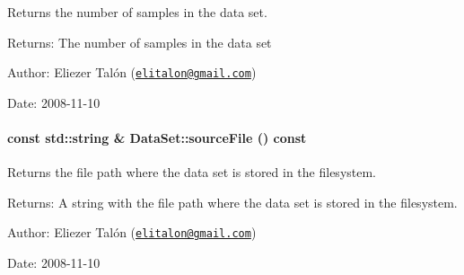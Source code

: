Returns the number of samples in the data set. 

\begin{Desc}
\item[Returns:]The number of samples in the data set\end{Desc}
\begin{Desc}
\item[Author:]Eliezer Talón (\href{mailto:elitalon@gmail.com}{\tt elitalon@gmail.com}) \end{Desc}
\begin{Desc}
\item[Date:]2008-11-10 \end{Desc}
\hypertarget{class_data_set_d7d233212f54f5c2764430b0cb1bea65}{
\paragraph[{sourceFile}]{\setlength{\rightskip}{0pt plus 5cm}const std::string \& DataSet::sourceFile () const}\hfill}
\label{class_data_set_d7d233212f54f5c2764430b0cb1bea65}


Returns the file path where the data set is stored in the filesystem. 

\begin{Desc}
\item[Returns:]A string with the file path where the data set is stored in the filesystem.\end{Desc}
\begin{Desc}
\item[Author:]Eliezer Talón (\href{mailto:elitalon@gmail.com}{\tt elitalon@gmail.com}) \end{Desc}
\begin{Desc}
\item[Date:]2008-11-10 \end{Desc}
